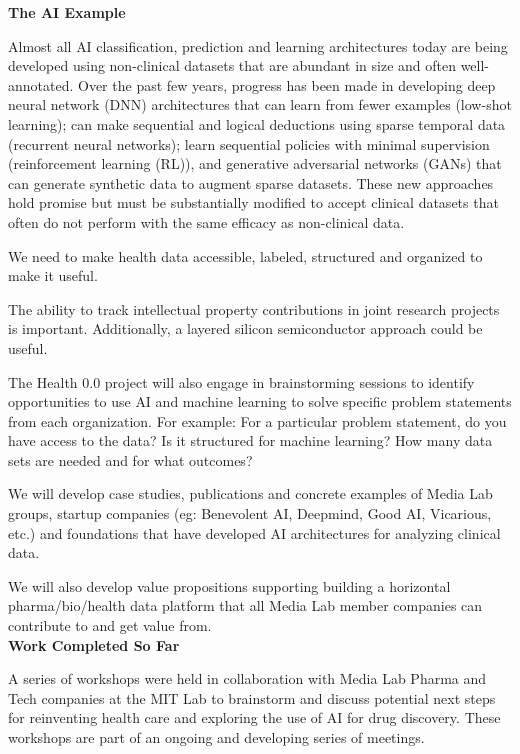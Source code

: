 \textbf{The \ac{AI} Example}

Almost all \ac{AI} classification, prediction and learning architectures today are being developed using non-clinical datasets that are abundant in size and often well-annotated. Over the past few years, progress has been made in developing deep neural network (DNN) architectures that can learn from fewer examples (low-shot learning); can make sequential and logical deductions using sparse temporal data (recurrent neural networks); learn sequential policies with minimal supervision (reinforcement learning (RL)), and generative adversarial networks (GANs) that can generate synthetic data to augment sparse datasets. These new approaches hold promise but must be substantially modified to accept clinical datasets that often do not perform with the same efficacy as non-clinical data. 

We need to make health data accessible, labeled, structured and organized to make it useful. 

The ability to track intellectual property contributions in joint research projects is important. Additionally, a layered silicon semiconductor approach could be useful.

The Health 0.0 project will also engage in brainstorming sessions to identify opportunities to use \ac{AI} and machine learning to solve specific problem statements from each organization. For example: For a particular problem statement, do you have access to the data? Is it structured for machine learning? How many data sets are needed and for what outcomes?

We will develop case studies, publications and concrete examples of Media Lab groups, startup companies (eg: Benevolent \ac{AI}, Deepmind, Good \ac{AI}, Vicarious, etc.) and foundations that have developed \ac{AI} architectures for analyzing clinical data.

We will also develop value propositions supporting building a horizontal pharma/bio/health data platform that all Media Lab member companies can contribute to and get value from. \\

\textbf{Work Completed So Far}

A series of workshops were held in collaboration with Media Lab Pharma and Tech companies at the MIT Lab to brainstorm and discuss potential next steps for reinventing health care and exploring the use of \ac{AI} for drug discovery. These workshops are part of an ongoing and developing series of meetings.

